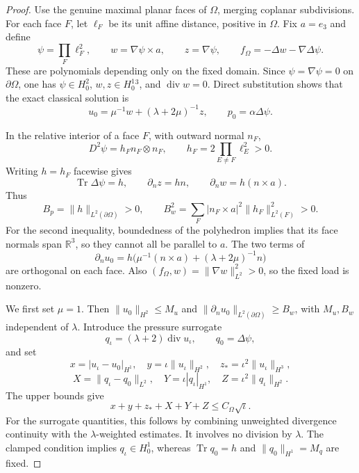 \documentclass[11pt,a4paper]{article}
\theoremstyle{remark}
\numberwithin{equation}{section}
\begin{document}
\begin{proof}
Use the genuine maximal planar faces of $\Omega$, merging coplanar
subdivisions. For each face $F$, let $\ell_F$ be its unit affine distance,
positive in $\Omega$. Fix $a=e_3$ and define
\begin{equation}\label{eq:est-fixed-load}
 \psi=\prod_F\ell_F^2,
 \qquad w=\nabla\psi\times a,
 \qquad z=\nabla\psi,
 \qquad f_\Omega=-\Delta w-\nabla\Delta\psi.
\end{equation}
These are polynomials depending only on the fixed domain. Since
$\psi=\nabla\psi=0$ on $\partial\Omega$, one has
$\psi\in H_0^2$, $w,z\in H_0^1{}^3$, and
$\operatorname{div}w=0$. Direct substitution shows that the exact
classical solution is
\begin{equation}\label{eq:est-fixed-classical}
 u_0=\mu^{-1}w+(\lambda+2\mu)^{-1}z,
 \qquad p_0=\alpha\Delta\psi.
\end{equation}

In the relative interior of a face $F$, with outward normal $n_F$,
\[
 D^2\psi=h_F n_F\otimes n_F,
 \qquad h_F=2\prod_{E\ne F}\ell_E^2>0.
\]
Writing $h=h_F$ facewise gives
\[
 \operatorname{Tr}\Delta\psi=h,
 \qquad \partial_nz=hn,
 \qquad \partial_nw=h(n\times a).
\]
Thus
\[
 B_p=\|h\|_{L^2(\partial\Omega)}>0,
 \qquad
 B_w^2=\sum_F|n_F\times a|^2\|h_F\|_{L^2(F)}^2>0.
\]
For the second inequality, boundedness of the polyhedron implies that
its face normals span $\mathbb R^3$, so they cannot all be parallel to
$a$. The two terms of
\[
 \partial_nu_0=h\bigl(\mu^{-1}(n\times a)
                      +(\lambda+2\mu)^{-1}n\bigr)
\]
are orthogonal on each face. Also
$(f_\Omega,w)=\|\nabla w\|_{L^2}^2>0$, so the fixed load is nonzero.

We first set $\mu=1$. Then $\|u_0\|_{H^2}\le M_u$ and
$\|\partial_nu_0\|_{L^2(\partial\Omega)}\ge B_w$, with $M_u,B_w$
independent of $\lambda$. Introduce the pressure surrogate
\[
 q_\iota=(\lambda+2)\operatorname{div}u_\iota,
 \qquad q_0=\Delta\psi,
\]
and set
\[
 x=|u_\iota-u_0|_{H^1},\quad y=\iota\|u_\iota\|_{H^2},
 \quad z_*=\iota^2\|u_\iota\|_{H^3},
\]
\[
 X=\|q_\iota-q_0\|_{L^2},\quad
 Y=\iota|q_\iota|_{H^1},\quad
 Z=\iota^2\|q_\iota\|_{H^2}.
\]
The upper bounds give
\begin{equation}\label{eq:est-sharp-upper}
 x+y+z_*+X+Y+Z\le C_\Omega\sqrt\iota.
\end{equation}
For the surrogate quantities, this follows by combining unweighted
divergence continuity with the $\lambda$-weighted estimates. It involves
no division by $\lambda$. The clamped condition implies
$q_\iota\in H_0^1$, whereas $\operatorname{Tr}q_0=h$ and
$\|q_0\|_{H^1}=M_q$ are fixed.


\end{proof}
\end{document}
